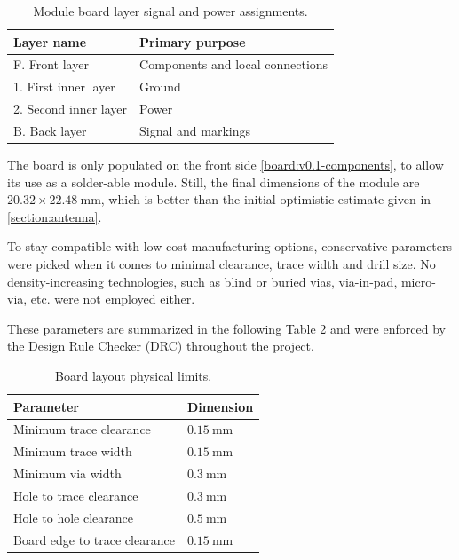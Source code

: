 \begin{table}[H]
\begin{center}
\caption{\label{table:board-layers}Module board layer signal and power assignments.}
    \begin{tabular}{|l|l|} \hline
    \textbf{Layer name}     & \textbf{Primary purpose} \\ \hline
    F. Front layer          & Components and local connections \\ \hline
    1. First inner layer    & Ground \\ \hline
    2. Second inner layer   & Power \\ \hline
    B. Back layer           & Signal and markings \\ \hline
    \end{tabular}
\end{center}
\end{table}

The board is only populated on the front side \ref{board:v0.1-components}, to allow its use as a solder-able module. Still, the final dimensions of the module are $20.32 \times 22.48~\mathrm{mm}$, which is better than the initial optimistic estimate given in \ref{section:antenna}.

To stay compatible with low-cost manufacturing options, conservative parameters were picked when it comes to minimal clearance, trace width and drill size. No density-increasing technologies, such as blind or buried vias, via-in-pad, micro-via, etc. were not employed either. 

These parameters are summarized in the following Table \ref{table:board-limits} and were enforced by the Design Rule Checker (DRC) throughout the project.

\begin{table}[H]
\begin{center}
\caption{\label{table:board-limits}Board layout physical limits.}
    \begin{tabular}{|l|l|} \hline
    \textbf{Parameter}          & \textbf{Dimension} \\ \hline
    Minimum trace clearance & $0.15~\mathrm{mm}$ \\ \hline
    Minimum trace width & $0.15~\mathrm{mm}$ \\ \hline
    Minimum via width & $0.3~\mathrm{mm}$ \\ \hline
    Hole to trace clearance & $0.3~\mathrm{mm}$ \\ \hline
    Hole to hole clearance & $0.5~\mathrm{mm}$ \\ \hline
    Board edge to trace clearance & $0.15~\mathrm{mm}$ \\ \hline
    \end{tabular}
\end{center}
\end{table}


